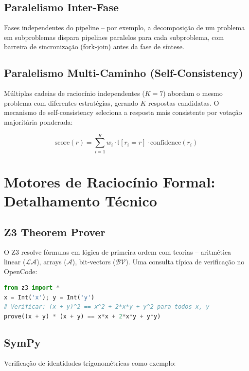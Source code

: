 \documentclass[12pt,a4paper,sumario=tradicional]{abntex2}
\begin{document}
\subsection{Paralelismo Inter-Fase}

Fases independentes do pipeline -- por exemplo, a decomposição de um problema em subproblemas dispara pipelines paralelos para cada subproblema, com barreira de sincronização (fork-join) antes da fase de síntese.

\subsection{Paralelismo Multi-Caminho (Self-Consistency)}

Múltiplas cadeias de raciocínio independentes ($K=7$) abordam o mesmo problema com diferentes estratégias, gerando $K$ respostas candidatas. O mecanismo de self-consistency seleciona a resposta mais consistente por votação majoritária ponderada:

\begin{equation}
    \text{score}(r) = \sum_{i=1}^{K} w_i \cdot \mathbb{I}[r_i = r] \cdot \text{confidence}(r_i)
\end{equation}

\section{Motores de Raciocínio Formal: Detalhamento Técnico}

\subsection{Z3 Theorem Prover}

O Z3 resolve fórmulas em lógica de primeira ordem com teorias -- aritmética linear ($\mathcal{L}\mathcal{A}$), arrays ($\mathcal{A}$), bit-vectors ($\mathcal{B}\mathcal{V}$). Uma consulta típica de verificação no OpenCode:

\begin{lstlisting}[language=python]
from z3 import *
x = Int('x'); y = Int('y')
# Verificar: (x + y)^2 == x^2 + 2*x*y + y^2 para todos x, y
prove((x + y) * (x + y) == x*x + 2*x*y + y*y)
\end{lstlisting}

\subsection{SymPy}

Verificação de identidades trigonométricas como exemplo:
\end{document}
